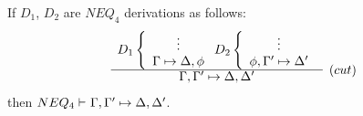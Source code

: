
\begin{LEMMA}\label{le:elcut}
If $D_1$, $D_2$ are $NEQ_4$ derivations as follows:
\[ \begin{array}{cl}
 D_1\left\{ \begin{array}{c}
  \vdots \\   \Gamma\Seq\Delta, \phi
 \end{array} \right.
 D_2\left\{ \begin{array}{c}
  \vdots \\   \phi, \Gamma'\Seq\Delta'
 \end{array} \right. \\ \cline{1-1}
\Gamma,\Gamma' \Seq \Delta,\Delta'
&   \raisebox{1.2ex}[1.5ex][0ex]{($cut$)}
\end{array} \]
then ${NEQ_4}\vdash^{{}}\Gamma,\Gamma'\mathrel{\mapsto}\Delta,\Delta'$.
\end{LEMMA}
